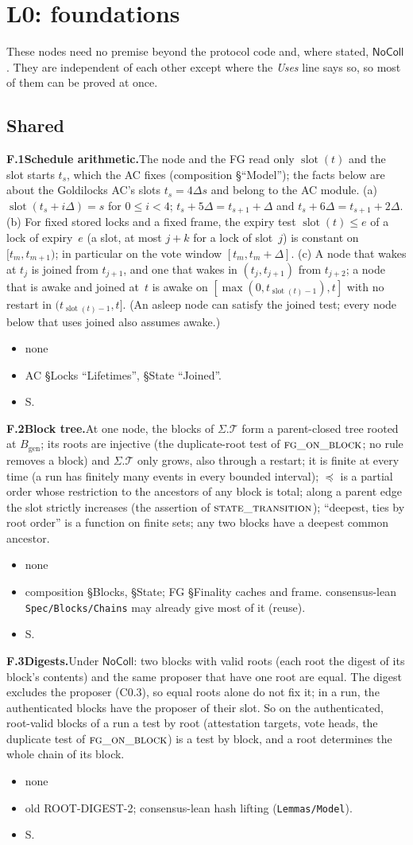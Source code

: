 \documentclass{article}
\newcommand{\genesis}{B_{\mathrm{gen}}}
\newcommand{\slot}{\operatorname{slot}}
\newcommand{\T}{\mathcal T}
\newcommand{\fname}[1]{\text{\textsc{#1}}}
\newcommand{\dagnode}[6]{%
\par\medskip\noindent\textbf{#1\enspace #2.}\enspace #3
\begin{itemize}[leftmargin=2.2em,itemsep=0pt,topsep=2pt]
\item[\emph{Uses}] #4
\item[\emph{Evid.}] #5
\item[\emph{Task}] #6
\end{itemize}}
\begin{document}
\section{L0: foundations}\label{sec:l0}

These nodes need no premise beyond the protocol code and, where stated,
$\mathsf{NoColl}$.  They are independent of each other except where the
\emph{Uses} line says so, so most of them can be proved at once.

\subsection{Shared}

\dagnode{F.1}{Schedule arithmetic}{The node and the FG read only $\slot(t)$
and the slot starts $t_s$, which the AC fixes (composition \S``Model''); the
facts below are about the Goldilocks AC's slots $t_s=4\Delta s$ and belong to
the AC module.  (a) $\slot(t_s+i\Delta)=s$ for
$0\leq i<4$; $t_s+5\Delta=t_{s+1}+\Delta$ and $t_s+6\Delta=t_{s+1}+2\Delta$.
(b) For fixed stored locks and a fixed frame, the expiry test
$\slot(t)\leq e$ of a lock of expiry~$e$ (a slot, at most $j+k$ for a lock
of slot~$j$) is constant on $[t_m,t_{m+1})$; in particular on the vote
window $[t_m,t_m+\Delta]$.  (c) A node that wakes at $t_j$ is joined from
$t_{j+1}$, and one that wakes in $(t_j,t_{j+1})$ from $t_{j+2}$; a node that is awake and joined at~$t$ is awake on
$[\max(0,t_{\slot(t)-1}),t]$ with no restart in $(t_{\slot(t)-1},t]$.  (An
asleep node can satisfy the joined test; every node below that uses joined also
assumes awake.)}
{none}{AC \S Locks ``Lifetimes'', \S State ``Joined''.}{S.}

\dagnode{F.2}{Block tree}{At one node, the blocks of $\Sigma.\T$ form a parent-closed tree rooted at
$\genesis$; its roots are injective (the duplicate-root test of
$\fname{fg\_on\_block}$; no rule removes a block) and $\Sigma.\T$ only grows,
also through a restart; it is finite at every time (a run has finitely many
events in every bounded interval); $\preceq$ is a partial order whose restriction to the ancestors of
any block is total; along a parent edge the slot strictly increases (the
assertion of $\fname{state\_transition}$); ``deepest, ties by root order'' is
a function on finite sets; any two blocks have a deepest common ancestor.}
{none}{composition \S Blocks, \S State; FG \S Finality caches and frame.  consensus-lean \texttt{Spec/Blocks/Chains}
may already give most of it (reuse).}{S.}

\dagnode{F.3}{Digests}{Under $\mathsf{NoColl}$: two blocks with valid roots
(each root the digest of its block's contents) and the same proposer that
have one root are equal.  The digest excludes the proposer (C0.3), so equal
roots alone do not fix it; in a run, the authenticated blocks have the
proposer of their slot.  So on the authenticated, root-valid blocks of a run
a test by root (attestation targets, vote heads, the duplicate test of
$\fname{fg\_on\_block}$) is a test by block, and a root determines the whole
chain of its block.}
{none}{old ROOT-DIGEST-2; consensus-lean hash lifting (\texttt{Lemmas/Model}).}{S.}
\end{document}
